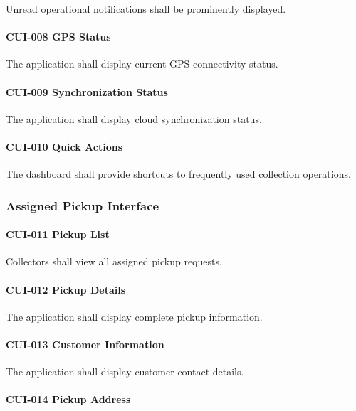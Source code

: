 Unread operational notifications shall be prominently displayed.

\paragraph{CUI-008 GPS Status}

The application shall display current GPS connectivity status.

\paragraph{CUI-009 Synchronization Status}

The application shall display cloud synchronization status.

\paragraph{CUI-010 Quick Actions}

The dashboard shall provide shortcuts to frequently used collection
operations.


\subsubsection*{Assigned Pickup Interface}

\paragraph{CUI-011 Pickup List}

Collectors shall view all assigned pickup requests.

\paragraph{CUI-012 Pickup Details}

The application shall display complete pickup information.

\paragraph{CUI-013 Customer Information}

The application shall display customer contact details.

\paragraph{CUI-014 Pickup Address}

